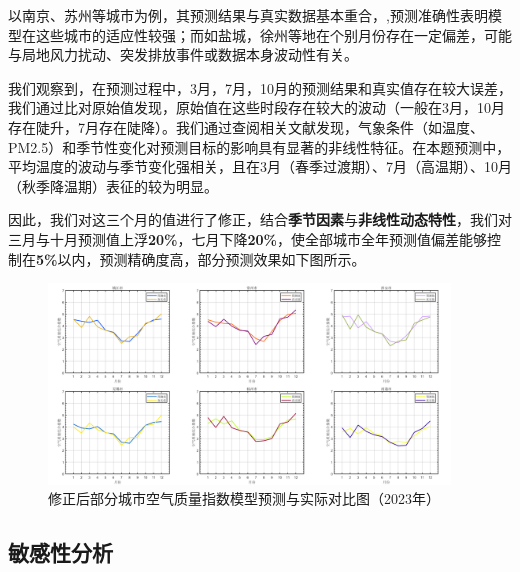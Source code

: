 \documentclass[a4paper,12pt]{article}
\begin{document}
	以南京、苏州等城市为例，其预测结果与真实数据基本重合，,预测准确性表明模型在这些城市的适应性较强；而如盐城，徐州等地在个别月份存在一定偏差，可能与局地风力扰动、突发排放事件或数据本身波动性有关。
	
	我们观察到，在预测过程中，3月，7月，10月的预测结果和真实值存在较大误差，我们通过比对原始值发现，原始值在这些时段存在较大的波动（一般在3月，10月存在陡升，7月存在陡降）。我们通过查阅相关文献发现，气象条件（如温度、PM2.5）和季节性变化对预测目标的影响具有显著的非线性特征。在本题预测中，平均温度的波动与季节变化强相关，且在3月（春季过渡期）、7月（高温期）、10月（秋季降温期）表征的较为明显。
	
	因此，我们对这三个月的值进行了修正，结合\textbf{季节因素}与\textbf{非线性动态特性}，我们对三月与十月预测值上浮\textbf{20\%}，七月下降\textbf{20\%}，使全部城市全年预测值偏差能够控制在\textbf{5\%}以内，预测精确度高，部分预测效果如下图所示。
	
		\begin{figure}[htbp]
		\centering
		\includegraphics[width=0.95\textwidth]{combined_6cities_aqi.png}
		\caption{修正后部分城市空气质量指数模型预测与实际对比图（2023年）}
		
	\end{figure}
	
	
	\subsection{敏感性分析}
	
\end{document}
